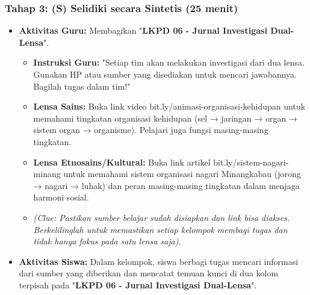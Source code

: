 \documentclass[a4paper,12pt]{article}
\begin{document}
\subsubsection{Tahap 3: (S) Selidiki secara Sintetis (25 menit)}
\begin{itemize}
\item \textbf{Aktivitas Guru:} Membagikan "\textbf{LKPD 06 - Jurnal Investigasi Dual-Lensa}".
    \begin{itemize}
    \item \textbf{Instruksi Guru:} "Setiap tim akan melakukan investigasi dari dua lensa. Gunakan HP atau sumber yang disediakan untuk mencari jawabannya. Bagilah tugas dalam tim!"
    \item \textbf{Lensa Sains:} Buka link video bit.ly/animasi-organisasi-kehidupan untuk memahami tingkatan organisasi kehidupan (sel → jaringan → organ → sistem organ → organisme). Pelajari juga fungsi masing-masing tingkatan.
    \item \textbf{Lensa Etnosains/Kultural:} Buka link artikel bit.ly/sistem-nagari-minang untuk memahami sistem organisasi nagari Minangkabau (jorong → nagari → luhak) dan peran masing-masing tingkatan dalam menjaga harmoni sosial.
    \item \textit{(Clue: Pastikan sumber belajar sudah disiapkan dan link bisa diakses. Berkelilinglah untuk memastikan setiap kelompok membagi tugas dan tidak hanya fokus pada satu lensa saja).}
    \end{itemize}
\item \textbf{Aktivitas Siswa:} Dalam kelompok, siswa berbagi tugas mencari informasi dari sumber yang diberikan dan mencatat temuan kunci di dua kolom terpisah pada "\textbf{LKPD 06 - Jurnal Investigasi Dual-Lensa}".
\end{itemize}
\end{document}
